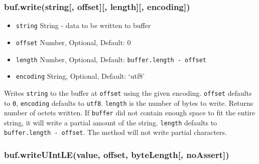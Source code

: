 \subsubsection{buf.write(string{[}, offset{]}{[}, length{]}{[},
encoding{]})}\label{buf.writestring-offset-length-encoding}

\begin{itemize}
\itemsep1pt\parskip0pt
\item
  \texttt{string} String - data to be written to buffer
\item
  \texttt{offset} Number, Optional, Default: 0
\item
  \texttt{length} Number, Optional, Default:
  \texttt{buffer.length\ -\ offset}
\item
  \texttt{encoding} String, Optional, Default: `utf8'
\end{itemize}

Writes \texttt{string} to the buffer at \texttt{offset} using the given
encoding. \texttt{offset} defaults to \texttt{0}, \texttt{encoding}
defaults to \texttt{\textquotesingle{}utf8\textquotesingle{}}.
\texttt{length} is the number of bytes to write. Returns number of
octets written. If \texttt{buffer} did not contain enough space to fit
the entire string, it will write a partial amount of the string.
\texttt{length} defaults to \texttt{buffer.length\ -\ offset}. The
method will not write partial characters.

\begin{Shaded}
\begin{Highlighting}[]
 \NormalTok{(}\NormalTok{);}
\NormalTok{(}\NormalTok{, }\NormalTok{);}
 \NormalTok{+ }\NormalTok{(}\NormalTok{, }
\end{Highlighting}
\end{Shaded}

\subsubsection{buf.writeUIntLE(value, offset, byteLength{[},
noAssert{]})}\label{buf.writeuintlevalue-offset-bytelength-noassert}

